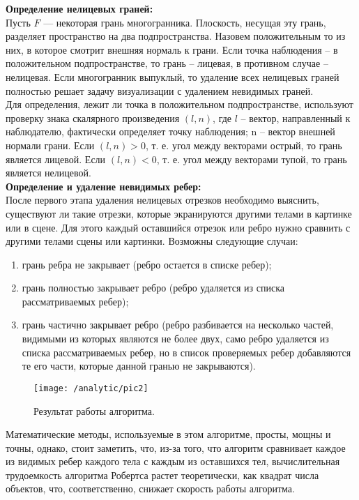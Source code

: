 \textbf{Определение нелицевых граней:}\\

Пусть $F$ — некоторая грань многогранника. Плоскость, несущая эту грань, разделяет пространство на два подпространства. Назовем  положительным то  из них, в которое смотрит внешняя нормаль к грани. Если точка наблюдения – в положительном подпространстве, то грань – лицевая, в противном случае – нелицевая. Если многогранник выпуклый, то удаление всех нелицевых граней полностью решает задачу визуализации с удалением невидимых граней.\\

Для определения, лежит ли точка в положительном подпространстве, используют проверку знака скалярного произведения $(l, n)$, где $l$ – вектор, направленный к наблюдателю, фактически определяет точку наблюдения; n – вектор внешней нормали грани. Если $(l, n) > 0$, т. е. угол между векторами острый, то грань является лицевой. Если $(l, n) < 0$, т. е. угол между векторами тупой, то грань является нелицевой.\\

\textbf{Определение и удаление невидимых ребер:}\\

После первого этапа удаления нелицевых отрезков необходимо выяснить, существуют ли такие отрезки, которые экранируются другими телами в картинке или в сцене. Для этого каждый оставшийся отрезок или ребро нужно сравнить с другими телами сцены или картинки.
Возможны следующие случаи:

\begin{enumerate}
	\item грань ребра не закрывает (ребро остается в списке ребер);
	\item грань полностью закрывает ребро (ребро удаляется из списка рассматриваемых ребер);
	\item грань частично закрывает ребро (ребро разбивается на несколько частей, видимыми из которых являются не более двух, само ребро удаляется из списка рассматриваемых ребер, но в список проверяемых ребер добавляются те его части, которые данной гранью не закрываются).
\end{enumerate}

\begin{figure}[H]
\center
\texttt{[image: /analytic/pic2]}
\caption{Результат работы алгоритма.}
\end{figure}

Математические методы, используемые в этом алгоритме, просты, мощны и точны, однако, стоит заметить, что, из-за того, что алгоритм сравнивает каждое из видимых ребер каждого тела с каждым из оставшихся тел, вычислительная трудоемкость алгоритма Робертса растет теоретически, как квадрат числа объектов, что, соответственно, снижает скорость работы алгоритма.

